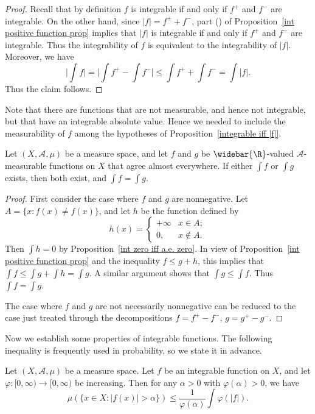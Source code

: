\begin{proof}
Recall that by definition $f$ is integrable if and only if $f^+$ and $f^-$ are integrable. On the other hand, since $|f|=f^++f^-$, part () of Proposition~\ref{int positive function prop} implies that $|f|$ is integrable if and only if $f^+$ and $f^-$ are integrable. Thus the integrability of $f$ is equivalent to the integrability of $|f|$. Moreover, we have
\[\Big|\int f\Big|=\Big|\int f^+-\int f^-\Big|\leq\int f^++\int f^-=\int|f|.\]
Thus the claim follows.
\end{proof}
\begin{remark}
Note that there are functions that are not measurable, and hence not integrable, but that have an integrable absolute value. Hence we needed to include the measurability of $f$ among the hypotheses of Proposition~\ref{integrable iff |f|}.
\end{remark}
\begin{proposition}\label{int of a.e. equal function}
Let $(X,\mathcal{A},\mu)$ be a measure space, and let $f$ and $g$ be $\widebar{\R}$-valued $\mathcal{A}$-measurable functions on $X$ that agree almost everywhere. If either $\int f$ or $\int g$ exists, then both exist, and $\int f=\int g$.
\end{proposition}
\begin{proof}
First consider the case where $f$ and $g$ are nonnegative. Let $A=\{x:f(x)\neq f(x)\}$, and let $h$ be the function defined by
\[h(x)=\begin{cases}
+\infty&x\in A;\\
0,&x\notin A.
\end{cases}\]
Then $\int h=0$ by Proposition~\ref{int zero iff a.e. zero}. In view of Proposition~\ref{int positive function prop} and the inequality $f\leq g+h$, this implies that $\int f\leq\int g+\int h=\int g$. A similar argument shows that $\int g\leq\int f$. Thus $\int f=\int g$.\par
The case where $f$ and $g$ are not necessarily nonnegative can be reduced to the case just treated through the decompositions $f=f^+-f^-$, $g=g^+-g^-$.
\end{proof}
Now we establish some properties of integrable functions. The following inequality is frequently used in probability, so we state it in advance.
\begin{proposition}\label{Markov inequality}
Let $(X,\mathcal{A},\mu)$ be a measure space. Let $f$ be an integrable function on $X$, and let $\varphi:[0,\infty)\to[0,\infty)$ be increasing. Then for any $\alpha>0$ with $\varphi(\alpha)>0$, we have
\[\mu(\{x\in X:|f(x)|>\alpha\})\leq\frac{1}{\varphi(\alpha)}\int\varphi(|f|).\]
\end{proposition}
